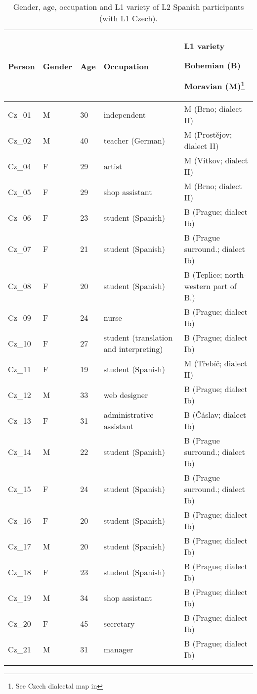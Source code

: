 \begin{table}[p]
\begin{tabularx}{\textwidth}{lllQQ}

\lsptoprule

{Person} & {Gender} & {Age} & {Occupation} & {L1 variety}

{Bohemian (B)}

{Moravian (M)\footnote{See Czech dialectal map in }}\\
\midrule
Cz\_01 & M & 30 & independent & M (Brno; dialect II)\\
Cz\_02 & M & 40 & teacher (German) & M (Prostějov; dialect II)\\
Cz\_04 & F & 29 & artist & M (Vítkov; dialect II)\\
Cz\_05 & F & 29 & shop assistant & M (Brno; dialect II)\\
Cz\_06 & F & 23 & student (Spanish) & B (Prague; dialect Ib)\\
Cz\_07 & F & 21 & student (Spanish) & B (Prague surround.; dialect Ib)\\
Cz\_08 & F & 20 & student (Spanish) & B (Teplice; north-western part of B.)\\
Cz\_09 & F & 24 & nurse & B (Prague; dialect Ib)\\
Cz\_10 & F & 27 & student (translation and interpreting) & B (Prague; dialect Ib)\\
Cz\_11 & F & 19 & student (Spanish) & M (Třebíč; dialect II)\\
Cz\_12 & M & 33 & web designer & B (Prague; dialect Ib)\\
Cz\_13 & F & 31 & administrative assistant & B (Čáslav; dialect Ib)\\
Cz\_14 & M & 22 & student (Spanish) & B (Prague surround.; dialect Ib)\\
Cz\_15 & F & 24 & student (Spanish) & B (Prague surround.; dialect Ib)\\
Cz\_16 & F & 20 & student (Spanish) & B (Prague; dialect Ib)\\
Cz\_17 & M & 20 & student (Spanish) & B (Prague; dialect Ib)\\
Cz\_18 & F & 23 & student (Spanish) & B (Prague; dialect Ib)\\
Cz\_19 & M & 34 & shop assistant & B (Prague; dialect Ib)\\
Cz\_20 & F & 45 & secretary & B (Prague; dialect Ib)\\
Cz\_21 & M & 31 & manager & B (Prague; dialect Ib)\\
\lspbottomrule
\end{tabularx}
\caption{\label{tab:3.2}Gender, age, occupation and L1 variety of L2 Spanish participants (with L1 Czech).}
\end{table}

